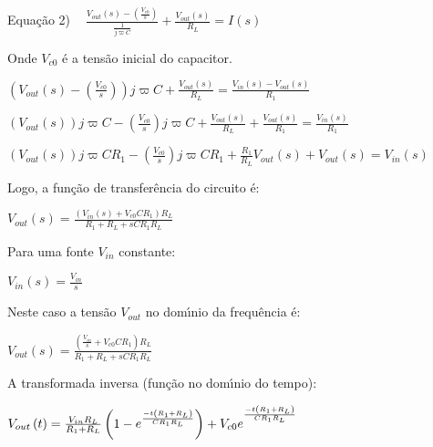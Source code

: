 \documentclass{article}
\begin{document}
\vspace{1pt}

Equa\c{c}\~{a}o 2) $\ \ \ \ \frac{V_{out}\left( s\right) -\left( \frac{V_{c0}%
}{s}\right) }{\frac{1}{j\varpi C}}+\frac{V_{out}\left( s\right) }{R_{L}}%
=I\left( s\right) $

\vspace{1pt}

Onde $V_{c0}$ \'{e} a tens\~{a}o inicial do capacitor.

\vspace{1pt}

$\left( V_{out}\left( s\right) -\left( \frac{V_{c0}}{s}\right) \right)
j\varpi C+\frac{V_{out}\left( s\right) }{R_{L}}=\frac{V_{in}\left( s\right)
-V_{out}\left( s\right) }{R_{1}}$

$\left( V_{out}\left( s\right) \right) j\varpi C-\left( \frac{V_{c0}}{s}%
\right) j\varpi C+\frac{V_{out}\left( s\right) }{R_{L}}+\frac{V_{out}\left(
s\right) }{R_{1}}=\frac{V_{in}\left( s\right) }{R_{1}}$

$\left( V_{out}\left( s\right) \right) j\varpi CR_{1}-\left( \frac{V_{c0}}{s}%
\right) j\varpi CR_{1}+\frac{R_{1}}{R_{L}}V_{out}\left( s\right)
+V_{out}\left( s\right) =V_{in}\left( s\right) $

\vspace{1pt}

Logo, a fun\c{c}\~{a}o de transfer\^{e}ncia do circuito \'{e}:

$V_{out}\left( s\right) =\frac{\left( V_{in}\left( s\right)
+V_{c0}CR_{1}\right) R_{L}}{R_{1}+R_{L}+sCR_{1}R_{L}}$

Para uma fonte $V_{in}$ constante:

$V_{in}\left( s\right) =\frac{V_{in}}{s}$

\vspace{1pt}

Neste caso a tens\~{a}o $V_{out}$ no dom\'{\i}nio da frequ\^{e}ncia \'{e}:

\vspace{1pt}

$V_{out}\left( s\right) =\frac{\left( \frac{V_{in}}{s}+V_{c0}CR_{1}\right)
R_{L}}{R_{1}+R_{L}+sCR_{1}R_{L}}$

\vspace{1pt}

A transformada inversa (fun\c{c}\~{a}o no dom\'{\i}nio do tempo):

$V_{out}\left( t\right) =\frac{V_{in}R_{L}}{R_{1}+R_{L}}\left( 1-e^{\frac{%
-t\left( R_{1}+R_{L}\right) }{CR_{1}R_{L}}}\right) +V_{c0}e^{^{\frac{%
-t\left( R_{1}+R_{L}\right) }{CR_{1}R_{L}}}}$
\end{document}
